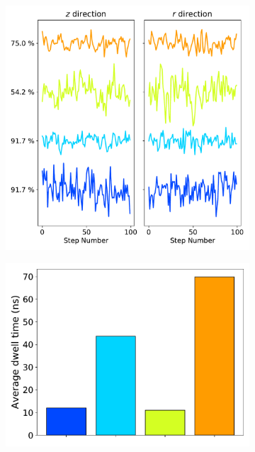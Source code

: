 \documentclass{article}
\begin{document}
  \begin{figure}
  \centering
  \begin{subfigure}{0.6\textwidth}
  \includegraphics[width=\textwidth]{common_states_MET.pdf}
  \caption{}\label{fig:common_states_MET_lines}
  \end{subfigure}
  \begin{subfigure}{0.35\textwidth}
  \includegraphics[width=\textwidth]{dwell_times_MET.pdf}
  \caption{}\label{fig:dwell_times_MET}

\end{subfigure}
\end{figure}
\end{document}
